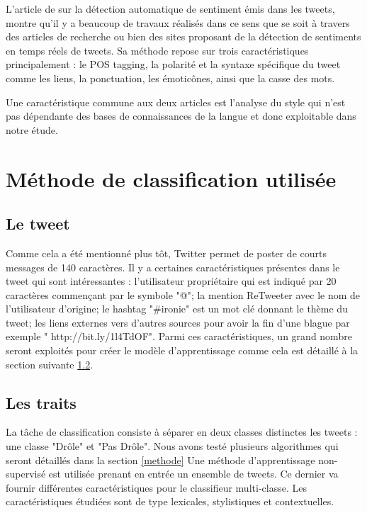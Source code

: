 \documentclass[10pt,a4paper,twoside]{article}
\begin{document}
L’article de \cite{Barbosa2010} sur la détection automatique de sentiment émis dans les tweets, montre qu’il y a beaucoup de travaux réalisés dans ce sens que se soit à travers des articles de recherche ou bien des sites proposant de la détection de sentiments en temps réels de tweets.  Sa méthode repose sur trois caractéristiques principalement : le POS tagging, la polarité et la syntaxe spécifique du tweet comme les liens, la ponctuation, les émoticônes, ainsi que la casse des mots. 

Une caractéristique commune aux deux articles est l’analyse du style qui n’est pas dépendante des bases de connaissances de la langue et donc exploitable dans notre étude.

\section{Méthode de classification utilisée}
\label{methClass}
\subsection{Le tweet} 
Comme cela a été mentionné plus tôt, Twitter permet de poster de courts messages de 140 caractères. Il y a certaines caractéristiques présentes dans le tweet qui sont intéressantes : l'utilisateur propriétaire qui est indiqué par 20 caractères commençant par le symbole "@"; la mention ReTweeter avec le nom de l'utilisateur d'origine; le hashtag "\#ironie" est un mot clé donnant le thème du tweet; les liens externes vers d'autres sources pour avoir la fin d'une blague par exemple " http://bit.ly/1l4TdOF". Parmi ces caractéristiques, un grand nombre seront exploités pour créer le modèle d'apprentissage comme cela est détaillé à la section suivante \ref{features}.


\subsection{Les traits}
\label{features}
La tâche de classification consiste à séparer en deux classes distinctes les tweets : une classe "Drôle" et "Pas Drôle". Nous avons testé plusieurs algorithmes qui seront détaillés dans la section \ref{methode}
Une méthode d'apprentissage non-supervisé est utilisée prenant en entrée un ensemble de tweets. Ce dernier va fournir différentes caractéristiques pour le classifieur multi-classe. Les caractéristiques étudiées sont de type lexicales, stylistiques et contextuelles. 
\end{document}
